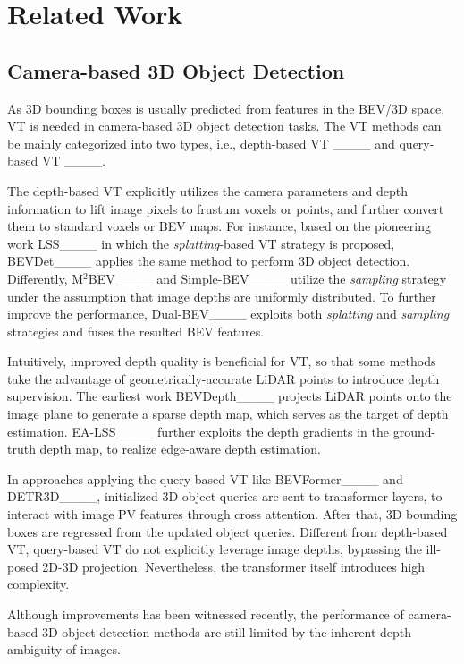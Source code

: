 \section{Related Work}
\label{related work}
\subsection{Camera-based 3D Object Detection}
As 3D bounding boxes is usually predicted from features in the BEV/3D space, VT is needed in camera-based 3D object detection tasks. The VT methods can be mainly categorized into two types, i.e., depth-based VT ____ and query-based VT ____.

The depth-based VT explicitly utilizes the camera parameters and depth information to lift image pixels to frustum voxels or points, and further convert them to standard voxels or BEV maps. For instance, based on the pioneering work LSS____ in which the \textit{splatting}-based VT strategy is proposed, BEVDet____ applies the same method to perform 3D object detection. Differently, M$^2$BEV____ and Simple-BEV____ utilize the \textit{sampling} strategy under the assumption that image depths are uniformly distributed. To further improve the performance, Dual-BEV____ exploits both \textit{splatting} and \textit{sampling} strategies and fuses the resulted BEV features.

Intuitively, improved depth quality is beneficial for VT, so that some methods take the advantage of geometrically-accurate LiDAR points to introduce depth supervision. The earliest work BEVDepth____ projects LiDAR points onto the image plane to generate a sparse depth map, which serves as the target of depth estimation. EA-LSS____ further exploits the depth gradients in the ground-truth depth map, to realize edge-aware depth estimation.

In approaches applying the query-based VT like BEVFormer____ and DETR3D____, initialized 3D object queries are sent to transformer layers, to interact with image PV features through cross attention. After that, 3D bounding boxes are regressed from the updated object queries. Different from depth-based VT, query-based VT do not explicitly leverage image depths, bypassing the ill-posed 2D-3D projection. Nevertheless, the transformer itself introduces high complexity.

Although improvements has been witnessed recently, the performance of camera-based 3D object detection methods are still limited by the inherent depth ambiguity of images. 

